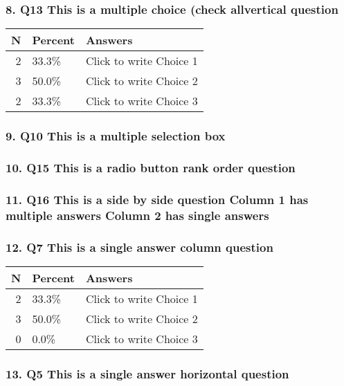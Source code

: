 \documentclass{article}\usepackage[]{graphicx}\usepackage[]{color}
\begin{document}
\hfill \break \hfill \break
\subsubsection*{8. Q13
This is a multiple choice (check allvertical question}

\begin{tabular}{r|l|l}
\hline
N & Percent & Answers\\
\hline
2 & 33.3\% & Click to write Choice 1\\
\hline
3 & 50.0\% & Click to write Choice 2\\
\hline
2 & 33.3\% & Click to write Choice 3\\
\hline
\end{tabular}


\hfill \break \hfill \break
\subsubsection*{9. Q10
This is a multiple selection box}

\hfill \break \hfill \break
\subsubsection*{10. Q15
This is a radio button rank order question}

\hfill \break \hfill \break
\subsubsection*{11. Q16
This is a side by side question Column 1 has multiple answers Column 2 has single answers}

\hfill \break \hfill \break
\subsubsection*{12. Q7
This is a single answer column question}

\begin{tabular}{r|l|l}
\hline
N & Percent & Answers\\
\hline
2 & 33.3\% & Click to write Choice 1\\
\hline
3 & 50.0\% & Click to write Choice 2\\
\hline
0 & 0.0\% & Click to write Choice 3\\
\hline
\end{tabular}


\hfill \break \hfill \break
\subsubsection*{13. Q5
This is a single answer horizontal question}
\end{document}
